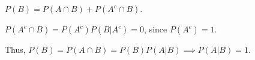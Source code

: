 $P(B) = P(A \cap B) + P(A ^{c} \cap B)$.

$P(A^{c} \cap B) = P(A^{c})P(B|A^{c}) = 0$, since $P(A^{c}) = 1$.

Thus, $P(B) = P(A \cap B) = P(B)P(A|B) \implies P(A|B) = 1$.